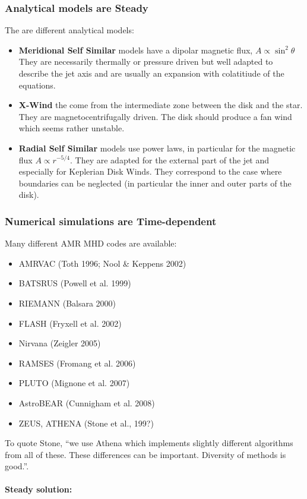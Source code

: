 \documentclass[10pt,a4paper,english,draft]{article}
\begin{document}
\subsubsection{Analytical models are Steady}
The are different analytical models:
\begin{itemize}
\item \textbf{Meridional Self Similar} models have a dipolar magnetic flux, $A \propto \sin^2\theta$ They are necessarily thermally or pressure driven but well adapted to describe the jet axis and are usually an expansion with colatitiude of the equations.
\item \textbf{X-Wind} the come from the intermediate zone between the disk and the star. They are magnetocentrifugally driven. The disk should produce a fan wind which seems rather unstable.
 \item \textbf{Radial Self Similar} models use power laws, in particular for the magnetic flux $A \propto r^{-5/4}$. They are adapted for the external part of the jet and especially for Keplerian Disk Winds. They correspond to the case where boundaries can be neglected (in particular the inner and outer parts of the disk).

\end{itemize}
\subsubsection{Numerical simulations are Time-dependent}
Many different AMR MHD codes are available:
\begin{itemize}
\item AMRVAC (Toth 1996; Nool \& Keppens 2002)
\item BATSRUS (Powell et al. 1999)
\item RIEMANN (Balsara 2000)
\item FLASH (Fryxell et al. 2002)
\item Nirvana (Zeigler 2005)
\item RAMSES (Fromang et al. 2006)
\item PLUTO (Mignone et al. 2007)
\item AstroBEAR (Cunnigham et al. 2008)
\item ZEUS, ATHENA (Stone et al., 199?)
\end{itemize}
To quote Stone, ``we use Athena which implements slightly different algorithms from all of these. These differences can be important. Diversity of methods is good.''.

\paragraph{Steady solution:}
\end{document}
